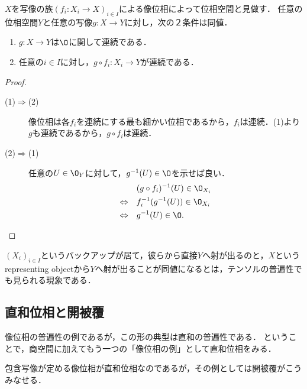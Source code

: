 \documentclass[uplatex,dvipdfmx]{jsreport}
\begin{document}
\begin{proposition}[誘導位相の普遍性の双対命題]\label{prop-universality-of-initial-topology}
    $X$を写像の族$(f_i:X_i\to X)_{i\in I}$による像位相によって位相空間と見做す．
    任意の位相空間$Y$と任意の写像$g:X\to Y$に対し，次の２条件は同値．
    \begin{enumerate}
        \item $g:X\to Y$は$\O$に関して連続である．
        \item 任意の$i\in I$に対し，$g\circ f_i:X_i\to Y$が連続である．
    \end{enumerate}
\end{proposition}
\begin{proof}\mbox{}
    \begin{description}
        \item[(1)$\Rightarrow$(2)] 像位相は各$f_i$を連続にする最も細かい位相であるから，$f_i$は連続．(1)より$g$も連続であるから，$g\circ f_i$は連続．
        \item[(2)$\Rightarrow$(1)] 任意の$U\in\O_Y$に対して，$g^{-1}(U)\in\O$を示せば良い．
        \begin{align*}
            &(g\circ f_i)^{-1}(U)\in\O_{X_i}\\
            \Leftrightarrow\quad&f^{-1}_i(g^{-1}(U))\in\O_{X_i}\\
            \Leftrightarrow\quad&g^{-1}(U)\in\O.
        \end{align*}
    \end{description}
\end{proof}
\begin{remarks}
    $(X_i)_{i\in I}$というバックアップが居て，彼らから直接$Y$へ射が出るのと，$X$というrepresenting objectから$Y$へ射が出ることが同値になるとは，テンソルの普遍性でも見られる現象である．
\end{remarks}

\subsection{直和位相と開被覆}

\begin{tcolorbox}[colframe=ForestGreen, colback=ForestGreen!10!white, breakable ,colbacktitle=ForestGreen!40!white, coltitle=black,fonttitle=\bfseries\sffamily, title=$Y$の位相が全射$f$による像位相であるための十分条件]
    像位相の普遍性の例であるが，この形の典型は直和の普遍性である．
    ということで，商空間に加えてもう一つの「像位相の例」として直和位相をみる．
    
    包含写像が定める像位相が直和位相なのであるが，その例としては開被覆がこうみなせる．
\end{tcolorbox}
\end{document}

